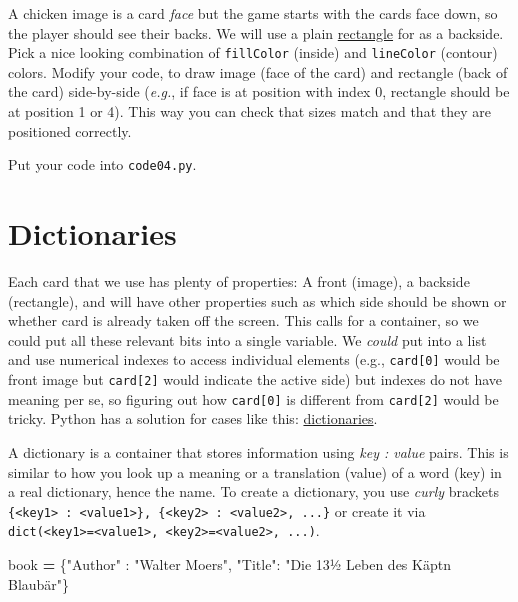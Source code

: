\documentclass[
]{book}
\newenvironment{Shaded}{\begin{snugshade}}{\end{snugshade}}
\newcommand{\NormalTok}[1]{#1}
\newcommand{\OperatorTok}[1]{\textcolor[rgb]{0.81,0.36,0.00}{\textbf{#1}}}
\newcommand{\StringTok}[1]{\textcolor[rgb]{0.31,0.60,0.02}{#1}}
\begin{document}
A chicken image is a card \emph{face} but the game starts with the cards face down, so the player should see their backs. We will use a plain \href{https://psychopy.org/api/visual/rect.html}{rectangle} for as a backside. Pick a nice looking combination of \texttt{fillColor} (inside) and \texttt{lineColor} (contour) colors. Modify your code, to draw image (face of the card) and rectangle (back of the card) side-by-side (\emph{e.g.}, if face is at position with index 0, rectangle should be at position 1 or 4). This way you can check that sizes match and that they are positioned correctly.

Put your code into \texttt{code04.py}.

\hypertarget{dictionaries}{%
\section{Dictionaries}\label{dictionaries}}

Each card that we use has plenty of properties: A front (image), a backside (rectangle), and will have other properties such as which side should be shown or whether card is already taken off the screen. This calls for a container, so we could put all these relevant bits into a single variable. We \emph{could} put into a list and use numerical indexes to access individual elements (e.g., \texttt{card{[}0{]}} would be front image but \texttt{card{[}2{]}} would indicate the active side) but indexes do not have meaning per se, so figuring out how \texttt{card{[}0{]}} is different from \texttt{card{[}2{]}} would be tricky. Python has a solution for cases like this: \href{https://docs.python.org/3/library/stdtypes.html\#dict}{dictionaries}.

A dictionary is a container that stores information using \emph{key : value} pairs. This is similar to how you look up a meaning or a translation (value) of a word (key) in a real dictionary, hence the name. To create a dictionary, you use \emph{curly} brackets \texttt{\{\textless{}key1\textgreater{}\ :\ \textless{}value1\textgreater{}\},\ \{\textless{}key2\textgreater{}\ :\ \textless{}value2\textgreater{},\ ...\}} or create it via \texttt{dict(\textless{}key1\textgreater{}=\textless{}value1\textgreater{},\ \textless{}key2\textgreater{}=\textless{}value2\textgreater{},\ ...)}.

\begin{Shaded}
\begin{Highlighting}[]
\NormalTok{book }\OperatorTok{=}\NormalTok{ \{}\StringTok{"Author"}\NormalTok{ : }\StringTok{"Walter Moers"}\NormalTok{,}
        \StringTok{"Title"}\NormalTok{: }\StringTok{"Die 13½ Leben des Käpt\textquotesingle{}n Blaubär"}\NormalTok{\}}
\end{Highlighting}
\end{Shaded}
\end{document}
